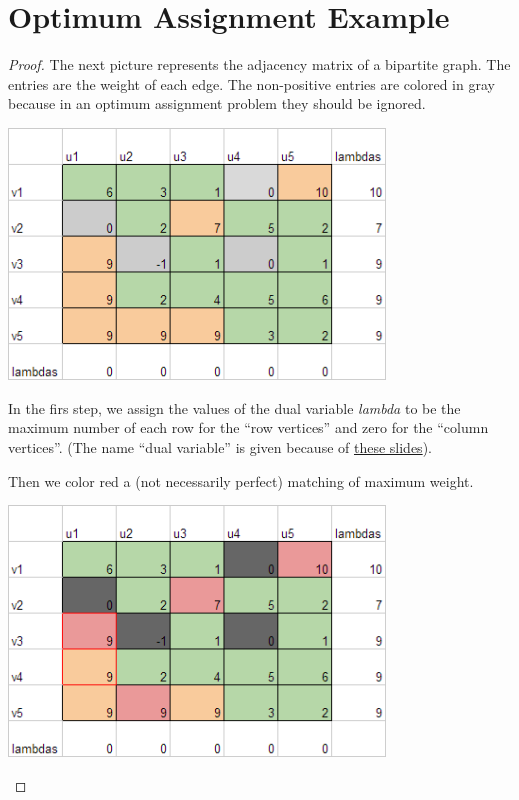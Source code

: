 ﻿\chapter{Optimum Assignment Example}

\begin{proof}
    The next picture represents the adjacency matrix of a bipartite graph.
    The entries are the weight of each edge. The non-positive entries
    are colored in gray because in an optimum assignment problem they
    should be ignored.
    
    \begin{center}
        \includegraphics[width=10cm]{Homework2/OptimumAssignment1.png}    
    \end{center}\pn
    
    In the firs step, we assign the values of the dual variable \textit{lambda} 
    to be the maximum number of each row for the ``row vertices'' and zero
    for the ``column vertices''. (The name ``dual variable'' is given
    because of \href{http://www.mpi-inf.mpg.de/departments/d1/teaching/ss12/AdvancedGraphAlgorithms/Slides06.pdf}{these slides}).\pn
    
    Then we color red a (not necessarily perfect) matching of maximum weight.\pn 
    
    \begin{center}
        \includegraphics[width=10cm]{Homework2/OptimumAssignment2.png}        
    \end{center}\pn
    

\end{proof}
